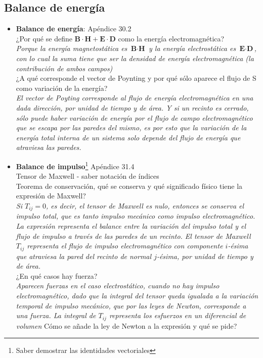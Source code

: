 \subsection*{Balance de energía}
\begin{itemize}
    \item \textbf{Balance de energía}: Apéndice 30.2\\
        ¿Por qué se define $\textbf{B}\cdot\textbf{H} + \textbf{E}\cdot\textbf{D}$ como la energía electromagnética?\\
        \indent \textit{Porque la energía magnetostática es $\textbf{B}\cdot \textbf{H}$ y la energía electrostática es $\textbf{E}\cdot\textbf{D}$, con lo cual la suma tiene que ser la densidad de energía electromagnética (la contribución de ambos campos)}\\
        ¿A qué corresponde el vector de Poynting y por qué sólo aparece el flujo de S como variación de la energía?\\
        \indent \textit{El vector de Poyting corresponde al flujo de energía electromagnética en una dada dirección, por unidad de tiempo y de área. Y si un recinto es cerrado, sólo puede haber variación de energía por el flujo de campo electromagnético que se escapa por las paredes del mismo, es por esto que la variación de la energía total interna de un sistema solo depende del flujo de energía que atraviesa las paredes.}

    \item \textbf{Balance de impulso}\footnote{Saber demostrar las identidades vectoriales} Apéndice 31.4\\
        Tensor de Maxwell - saber notación de índices\\
        Teorema de conservación, qué se conserva y qué significado físico tiene la expresión de Maxwell?\\
        \indent \textit{Si $T_{ij} = 0$, es decir, el tensor de Maxwell es nulo, entonces se conserva el impulso total, que es tanto impulso mecánico como impulso electromagnético. La expresión representa el balance entre la variación del impulso total y el flujo de impulso a través de las paredes de un recinto. El tensor de Maxwell $T_{ij}$ representa el flujo de impulso electromagnético con componente $i$-ésima que atraviesa la pared del recinto de normal $j$-ésima, por unidad de tiempo y de área.}\\
        ¿En qué casos hay fuerza?\\
        \indent \textit{Aparecen fuerzas en el caso electrostático, cuando no hay impulso electromagnético, dado que la integral del tensor queda igualada a la variación temporal de impulso mecánico, que por las leyes de Newton, corresponde a una fuerza. La integral de $T_{ij}$ representa los esfuerzos en un diferencial de volumen}
        \subitem Cómo se añade la ley de Newton a la expresión y qué se pide?
\end{itemize}

